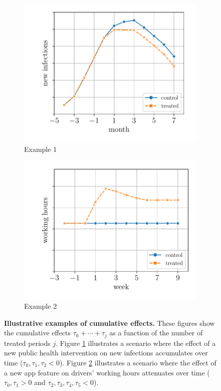 	\begin{figure}[t!]
	\begin{subfigure}{0.4\textwidth}
		\centering
		\includegraphics[width=1\linewidth]{plots/illustration/cumulative_effect_new_infection.pdf}
		\caption{Example 1}\label{fig:cumulative-effect} 
	\end{subfigure}\hfill
	\begin{subfigure}{0.4\textwidth}
		\centering
		\includegraphics[width=1\linewidth]{plots/illustration/wearout_effect_app.pdf}
		\caption{Example 2}\label{fig:wearout-effect} 
	\end{subfigure}
	\vspace{2mm}
	\caption{\textbf{Illustrative examples of cumulative effects.} These figures show the cumulative effects $\tau_0 + \cdots + \tau_j$ as a function of the number of treated periods $j$. Figure \ref{fig:cumulative-effect} illustrates a scenario where the effect of a new public health intervention on new infections accumulates over time ($\tau_0, \tau_1, \tau_2 < 0$). Figure \ref{fig:wearout-effect} illustrates a scenario where the effect of a new app feature on drivers' working hours attenuates over time ($\tau_0, \tau_1 > 0$ and $\tau_2, \tau_3, \tau_4, \tau_5 < 0$). 
	}
	\label{fig:example}
\end{figure}



